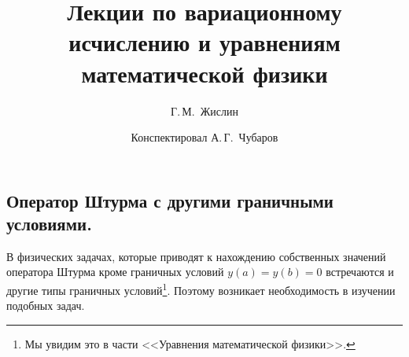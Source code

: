 \documentclass[12pt,a4paper,openany,fleqn]{book}
\newcommand{\mc}[1]{\ensuremath{\mathcal{#1}}}
\theoremstyle{definition}
\begin{document}
	\author{Г.\,М.~Жислин}
	\title{Лекции по вариационному исчислению и уравнениям математической физики}
	\date{Конспектировал А.\,Г.~Чубаров}
	
	
	
	\maketitle
	
	
	\renewcommand{\thepart}{\Asbuk{part}}
	\renewcommand{\thechapter}{\arabic{chapter}}
	\renewcommand{\thesection}{\arabic{section}}
	\renewcommand{\thesubsection}{\Roman{subsection}}
	\renewcommand{\thefootnote}{\roman{footnote}}
	\renewcommand{\phi}{\varphi}
	\renewcommand{\Re}{\ensuremath{\mc{R}e\,}}
	\renewcommand{\Im}{\ensuremath{\mc{I}m\,}}
	
	\setcounter{chapter}{6}
	\chapter{}
	\label{lecture7}
	\section{Оператор Штурма с другими граничными условиями.}
	\label{lecture7section1}
	В физических задачах, которые приводят к нахождению собственных значений оператора Штурма кроме граничных условий $y(a)=y(b)=0$ встречаются и другие типы граничных условий\footnote[1]{Мы увидим это в части <<Уравнения математической физики>>.}. Поэтому возникает необходимость в изучении подобных задач.
	
\end{document}

